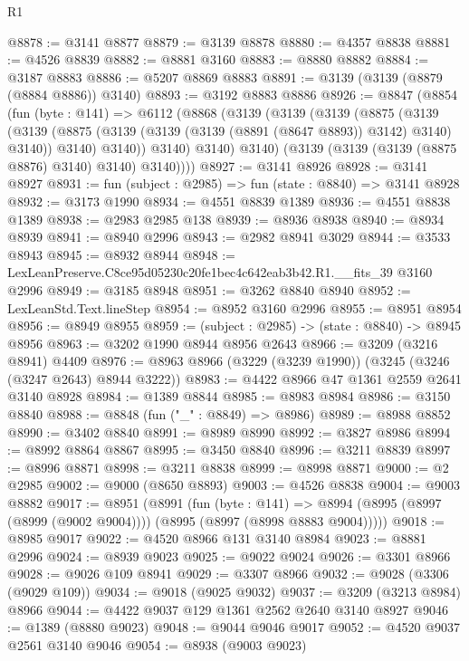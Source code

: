 \begin{lexlean}{R1}
\begin{coremodule}
@8878 := @3141 @8877
@8879 := @3139 @8878
@8880 := @4357 @8838
@8881 := @4526 @8839
@8882 := @8881 @3160
@8883 := @8880 @8882
@8884 := @3187 @8883
@8886 := @5207 @8869 @8883
@8891 := @3139 (@3139 (@8879 (@8884 @8886)) @3140)
@8893 := @3192 @8883 @8886
@8926 := @8847
    (@8854
      (fun (byte : @141) =>
      @6112
        (@8868
          (@3139
            (@3139
              (@3139
                (@8875
                  (@3139
                    (@3139
                      (@8875 (@3139 (@3139 (@3139 (@8891 (@8647 @8893)) @3142) @3140) @3140))
                      @3140)
                    @3140))
                @3140)
              @3140)
            @3140)
          (@3139 (@3139 (@3139 (@8875 @8876) @3140) @3140) @3140))))
@8927 := @3141 @8926
@8928 := @3141 @8927
@8931 := fun (subject : @2985) => fun (state : @8840) => @3141 @8928
@8932 := @3173 @1990
@8934 := @4551 @8839 @1389
@8936 := @4551 @8838 @1389
@8938 := @2983 @2985 @138
@8939 := @8936 @8938
@8940 := @8934 @8939
@8941 := @8940 @2996
@8943 := @2982 @8941 @3029
@8944 := @3533 @8943
@8945 := @8932 @8944
@8948 := LexLeanPreserve.C8ce95d05230c20fe1bec4c642eab3b42.R1.__fits_39 @3160 @2996
@8949 := @3185 @8948
@8951 := @3262 @8840 @8940
@8952 := LexLeanStd.Text.lineStep
@8954 := @8952 @3160 @2996
@8955 := @8951 @8954
@8956 := @8949 @8955
@8959 := (subject : @2985) -> (state : @8840) -> @8945 @8956
@8963 := @3202 @1990 @8944 @8956 @2643
@8966 := @3209 (@3216 @8941) @4409
@8976 := @8963 @8966 (@3229 (@3239 @1990)) (@3245 (@3246 (@3247 @2643) @8944 @3222))
@8983 := @4422 @8966 @47 @1361 @2559 @2641 @3140 @8928
@8984 := @1389 @8844
@8985 := @8983 @8984
@8986 := @3150 @8840
@8988 := @8848 (fun ("_" : @8849) => @8986)
@8989 := @8988 @8852
@8990 := @3402 @8840
@8991 := @8989 @8990
@8992 := @3827 @8986
@8994 := @8992 @8864 @8867
@8995 := @3450 @8840
@8996 := @3211 @8839
@8997 := @8996 @8871
@8998 := @3211 @8838
@8999 := @8998 @8871
@9000 := @2 @2985
@9002 := @9000 (@8650 @8893)
@9003 := @4526 @8838
@9004 := @9003 @8882
@9017 := @8951
    (@8991
      (fun (byte : @141) =>
      @8994 (@8995 (@8997 (@8999 (@9002 @9004)))) (@8995 (@8997 (@8998 @8883 @9004)))))
@9018 := @8985 @9017
@9022 := @4520 @8966 @131 @3140 @8984
@9023 := @8881 @2996
@9024 := @8939 @9023
@9025 := @9022 @9024
@9026 := @3301 @8966
@9028 := @9026 @109 @8941
@9029 := @3307 @8966
@9032 := @9028 (@3306 (@9029 @109))
@9034 := @9018 (@9025 @9032)
@9037 := @3209 (@3213 @8984) @8966
@9044 := @4422 @9037 @129 @1361 @2562 @2640 @3140 @8927
@9046 := @1389 (@8880 @9023)
@9048 := @9044 @9046 @9017
@9052 := @4520 @9037 @2561 @3140 @9046
@9054 := @8938 (@9003 @9023)

\end{coremodule}
\end{lexlean}
